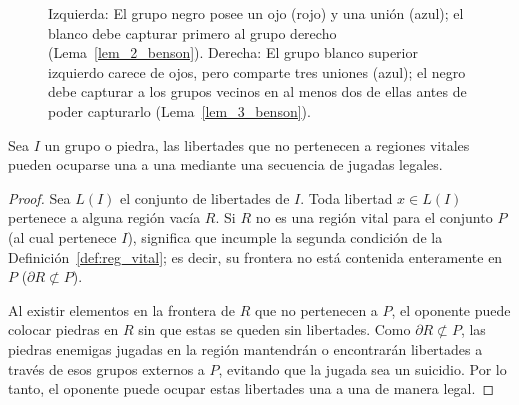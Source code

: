\begin{figure}[H]
	\caption{Izquierda: El grupo negro posee un ojo (rojo) y una unión (azul); el blanco debe capturar primero al grupo derecho (Lema~\ref{lem_2_benson}). Derecha: El grupo blanco superior izquierdo carece de ojos, pero comparte tres uniones (azul); el negro debe capturar a los grupos vecinos en al menos dos de ellas antes de poder capturarlo (Lema~\ref{lem_3_benson}).}
	\label{fig:lem_benson}
\end{figure}
\begin{lemma}\label{lem_4_benson}
	Sea $I$ un grupo o piedra, las libertades que no pertenecen a regiones vitales pueden ocuparse una a una mediante una secuencia de jugadas legales.
\end{lemma}
\begin{proof}
	Sea $L(I)$ el conjunto de libertades de $I$. Toda libertad $x \in L(I)$ pertenece a alguna región vacía $R$. Si $R$ no es una región vital para el conjunto $P$ (al cual pertenece $I$), significa que incumple la segunda condición de la Definición~\ref{def:reg_vital}; es decir, su frontera no está contenida enteramente en $P$ ($\partial R \not\subset P$).
	
	Al existir elementos en la frontera de $R$ que no pertenecen a $P$, el oponente puede colocar piedras en $R$ sin que estas se queden sin libertades. Como $\partial R \not\subset P$, las piedras enemigas jugadas en la región mantendrán o encontrarán libertades a través de esos grupos externos a $P$, evitando que la jugada sea un suicidio. Por lo tanto, el oponente puede ocupar estas libertades una a una de manera legal.
\end{proof}
